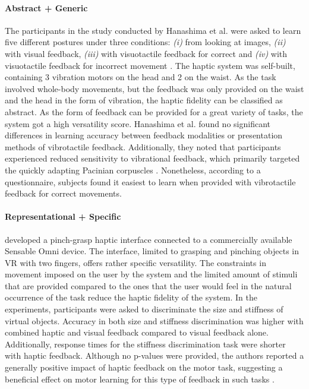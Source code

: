 \paragraph{Abstract + Generic} \label{sec:abstractgeneric}
The participants in the study conducted by Hanashima et al. were asked to learn five different postures under three conditions: \textit{(i)} from looking at images, \textit{(ii)} with visual feedback, \textit{(iii)} with visuotactile feedback for correct and \textit{(iv)} with visuotactile feedback for incorrect movement \cite{Hanashima2023}. The haptic system was self-built, containing 3 vibration motors on the head and 2 on the waist. As the task involved whole-body movements, but the feedback was only provided on the waist and the head in the form of vibration, the haptic fidelity can be classified as abstract. As the form of feedback can be provided for a great variety of tasks, the system got a high versatility score. 
Hanashima et al. found no significant differences in learning accuracy between feedback modalities or presentation methods of vibrotactile feedback. Additionally, they noted that participants experienced reduced sensitivity to vibrational feedback, which primarily targeted the quickly adapting Pacinian corpuscles \cite{Hanashima2023}. Nonetheless, according to a questionnaire, subjects found it easiest to learn when provided with vibrotactile feedback for correct movements.


\paragraph{Representational + Specific} \label{sec:representationalspecific}
\cite{Najdovski2020} developed a pinch-grasp haptic interface connected to a commercially available Sensable Omni device. The interface, limited to grasping and pinching objects in VR with two fingers, offers rather specific versatility. The constraints in movement imposed on the user by the system and the limited amount of stimuli that are provided compared to the ones that the user would feel in the natural occurrence of the task reduce the haptic fidelity of the system. 
In the experiments, participants were asked to discriminate the size and stiffness of virtual objects. Accuracy in both size and stiffness discrimination was higher with combined haptic and visual feedback compared to visual feedback alone. Additionally, response times for the stiffness discrimination task were shorter with haptic feedback. Although no p-values were provided, the authors reported a generally positive impact of haptic feedback on the motor task, suggesting a beneficial effect on motor learning for this type of feedback in such tasks \cite{Najdovski2020}. 

